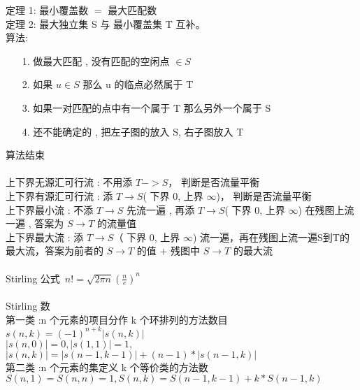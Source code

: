 定理 1: 最小覆盖数 $=$ 最大匹配数\\
定理 2: 最大独立集 S 与 最小覆盖集 T 互补。\\
算法:
\begin{enumerate}
\item[1.] 做最大匹配 , 没有匹配的空闲点 $\in S$
\item[2.] 如果 $u\in S$ 那么 u 的临点必然属于 T
\item[3.] 如果一对匹配的点中有一个属于 T 那么另外一个属于 S
\item[4.] 还不能确定的 , 把左子图的放入 S, 右子图放入 T
\end{enumerate}
算法结束
\\
\\
上下界无源汇可行流 : 不用添 $T-> S$， 判断是否流量平衡\\
上下界有源汇可行流 : 添 $T\rightarrow S$( 下界 $0$, 上界 $\infty$)， 判断是否流量平衡\\
上下界最小流 : 不添 $T\rightarrow S$ 先流一遍 , 再添 $T\rightarrow S$( 下界 $0$, 上界 $\infty$) 在残图上流一遍 , 答案为 $S\rightarrow T$ 的流量值\\
上下界最大流 : 添 $T\rightarrow S$（ 下界 $0$, 上界 $\infty$) 流一遍，再在残图上流一遍S到T的最大流，答案为前者的 $S\rightarrow T$ 的值 $+$ 残图中 $S\rightarrow T$ 的最大流\\
\\
Stirling 公式\ 
$
    n!=\sqrt{2\pi n}(\frac{n}{e})^n
$
\\
\\
Stirling 数 \\
第一类 :n 个元素的项目分作 k 个环排列的方法数目\\
$
    s(n, k) = (-1)^{n+k}|s(n, k)|
    $\\
    $
    |s(n, 0)|=0, |s(1, 1)|=1,
    $\\
    $
    |s(n, k)|=|s(n-1, k-1)|+(n-1)*|s(n-1, k)|
$
\\
第二类 :n 个元素的集定义 k 个等价类的方法数\\
$
    S(n,1)=S(n,n)=1,
    S(n,k)=S(n-1,k-1)+k*S(n-1,k)
$
